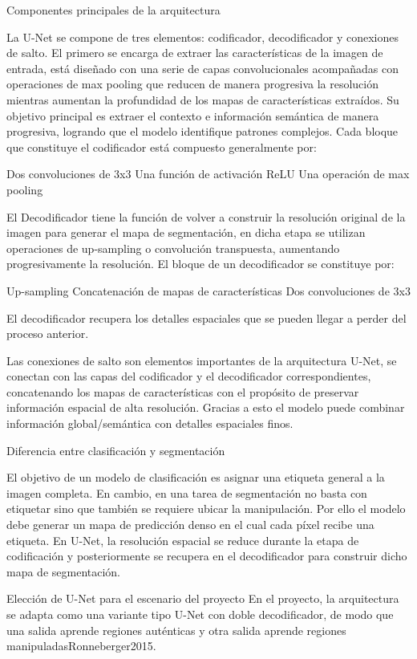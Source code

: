 Componentes principales de la arquitectura

La U-Net se compone de tres elementos: codificador, decodificador y conexiones de salto. 
El primero se encarga de extraer las características de la imagen de entrada, está diseñado con una serie de capas convolucionales acompañadas con operaciones de max pooling que reducen de manera progresiva la resolución mientras aumentan la profundidad de los mapas de características extraídos. Su objetivo principal es extraer el contexto e información semántica de manera progresiva, logrando que el modelo identifique patrones complejos. Cada bloque que constituye el codificador está compuesto generalmente por:

 Dos convoluciones de 3x3
 Una función de activación ReLU
 Una operación de max pooling


El Decodificador tiene la función de volver a construir la resolución original de la imagen para generar el mapa de segmentación, en dicha etapa se utilizan operaciones de up-sampling o convolución transpuesta, aumentando progresivamente la resolución. El bloque de un decodificador se constituye por:

    
 Up-sampling
 Concatenación de mapas de características
 Dos convoluciones de 3x3


El decodificador recupera los detalles espaciales que se pueden llegar a perder del proceso anterior.

Las conexiones de salto son elementos importantes de la arquitectura U-Net, se conectan con las capas del codificador y el decodificador correspondientes, concatenando los mapas de características con el propósito de preservar información espacial de alta resolución. Gracias a esto el modelo puede combinar información global/semántica con detalles espaciales finos.


Diferencia entre clasificación y segmentación

El objetivo de un modelo de clasificación es asignar una etiqueta general a la imagen completa. En cambio, en una tarea de segmentación no basta con etiquetar sino que también se requiere ubicar la manipulación. Por ello el modelo debe generar un mapa de predicción denso en el cual cada píxel recibe una etiqueta. En U-Net, la resolución espacial se reduce durante la etapa de codificación y posteriormente se recupera en el decodificador para construir dicho mapa de segmentación.

Elección de U-Net para el escenario del proyecto
En el proyecto, la arquitectura se adapta como una variante tipo U-Net con doble decodificador, de modo que una salida aprende regiones auténticas y otra salida aprende regiones manipuladasRonneberger2015.

